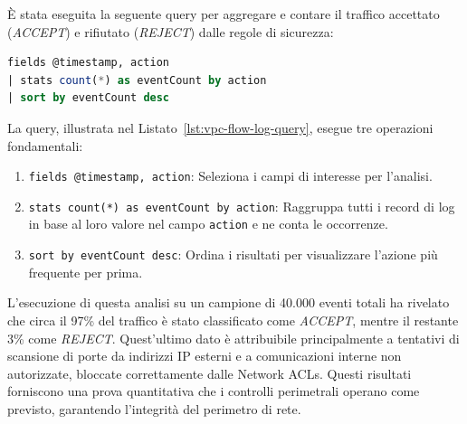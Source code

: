 \begin{itemize}
È stata eseguita la seguente query per aggregare e contare il traffico accettato (\textit{ACCEPT}) e rifiutato (\textit{REJECT}) dalle regole di sicurezza:

\begin{lstlisting}[language=Sql, style=sql, caption={Query per l'analisi dei VPC Flow Logs}, label={lst:vpc-flow-log-query}]
fields @timestamp, action
| stats count(*) as eventCount by action
| sort by eventCount desc
\end{lstlisting}

La query, illustrata nel Listato~\ref{lst:vpc-flow-log-query}, esegue tre operazioni fondamentali:
\begin{enumerate}
    \item \texttt{fields @timestamp, action}: Seleziona i campi di interesse per l'analisi.
    \item \texttt{stats count(*) as eventCount by action}: Raggruppa tutti i record di log in base al loro valore nel campo \texttt{action} e ne conta le occorrenze.
    \item \texttt{sort by eventCount desc}: Ordina i risultati per visualizzare l'azione più frequente per prima.
\end{enumerate}

L'esecuzione di questa analisi su un campione di 40.000 eventi totali ha rivelato che circa il 97\% del traffico è stato classificato come \textit{ACCEPT}, mentre il restante 3\% come \textit{REJECT}. Quest'ultimo dato è attribuibile principalmente a tentativi di scansione di porte da indirizzi IP esterni e a comunicazioni interne non autorizzate, bloccate correttamente dalle Network ACLs. Questi risultati forniscono una prova quantitativa che i controlli perimetrali operano come previsto, garantendo l'integrità del perimetro di rete.


\end{itemize}
